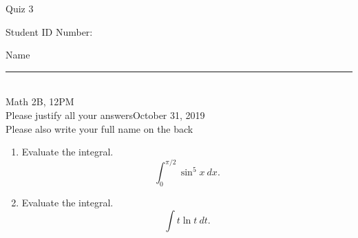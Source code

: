 \documentclass[12pt]{article}
\begin{document}
\begin{flushleft} 
\centerline{\LARGE{Quiz 3}} 
\vspace{5 mm}
{Student ID Number:}\hfill  
{Name \rule {2 in}{0.01in}}\\
Math 2B, 12PM
\\
{Please justify all your answers}\hfill {October 31, 2019}
\\
{Please also write your full name on the back} 

\medskip
\end{flushleft}

\begin{enumerate}
	\item Evaluate the integral.
	\[
	\int_0^{\pi/2}\sin^5x\ dx.
	\]
	\vfill
	\item Evaluate the integral.
	\[
	\int t\ln t\ dt.
	\]
	\vfill
\end{enumerate}

\end{document}
